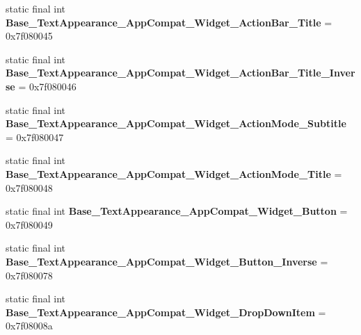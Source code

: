 \begin{DoxyCompactItemize}
\item 
\hypertarget{classandroid_1_1support_1_1v7_1_1appcompat_1_1_r_1_1style_a172e7de6432bf1869463c82f2299a826}{}static final int {\bfseries Base\+\_\+\+Text\+Appearance\+\_\+\+App\+Compat\+\_\+\+Widget\+\_\+\+Action\+Bar\+\_\+\+Title} = 0x7f080045\label{classandroid_1_1support_1_1v7_1_1appcompat_1_1_r_1_1style_a172e7de6432bf1869463c82f2299a826}

\item 
\hypertarget{classandroid_1_1support_1_1v7_1_1appcompat_1_1_r_1_1style_a69c4b6d6b5c8b2c1cf77fe514dd5c730}{}static final int {\bfseries Base\+\_\+\+Text\+Appearance\+\_\+\+App\+Compat\+\_\+\+Widget\+\_\+\+Action\+Bar\+\_\+\+Title\+\_\+\+Inverse} = 0x7f080046\label{classandroid_1_1support_1_1v7_1_1appcompat_1_1_r_1_1style_a69c4b6d6b5c8b2c1cf77fe514dd5c730}

\item 
\hypertarget{classandroid_1_1support_1_1v7_1_1appcompat_1_1_r_1_1style_a1dd69fd2c890662bdfa8c771a70447d3}{}static final int {\bfseries Base\+\_\+\+Text\+Appearance\+\_\+\+App\+Compat\+\_\+\+Widget\+\_\+\+Action\+Mode\+\_\+\+Subtitle} = 0x7f080047\label{classandroid_1_1support_1_1v7_1_1appcompat_1_1_r_1_1style_a1dd69fd2c890662bdfa8c771a70447d3}

\item 
\hypertarget{classandroid_1_1support_1_1v7_1_1appcompat_1_1_r_1_1style_a80946fe67e73e49cfbb18f10b23c24df}{}static final int {\bfseries Base\+\_\+\+Text\+Appearance\+\_\+\+App\+Compat\+\_\+\+Widget\+\_\+\+Action\+Mode\+\_\+\+Title} = 0x7f080048\label{classandroid_1_1support_1_1v7_1_1appcompat_1_1_r_1_1style_a80946fe67e73e49cfbb18f10b23c24df}

\item 
\hypertarget{classandroid_1_1support_1_1v7_1_1appcompat_1_1_r_1_1style_a6b427ebdf19f05932f60ad867fb296aa}{}static final int {\bfseries Base\+\_\+\+Text\+Appearance\+\_\+\+App\+Compat\+\_\+\+Widget\+\_\+\+Button} = 0x7f080049\label{classandroid_1_1support_1_1v7_1_1appcompat_1_1_r_1_1style_a6b427ebdf19f05932f60ad867fb296aa}

\item 
\hypertarget{classandroid_1_1support_1_1v7_1_1appcompat_1_1_r_1_1style_a75ec267d85c6e46c57ff7717ceafad6a}{}static final int {\bfseries Base\+\_\+\+Text\+Appearance\+\_\+\+App\+Compat\+\_\+\+Widget\+\_\+\+Button\+\_\+\+Inverse} = 0x7f080078\label{classandroid_1_1support_1_1v7_1_1appcompat_1_1_r_1_1style_a75ec267d85c6e46c57ff7717ceafad6a}

\item 
\hypertarget{classandroid_1_1support_1_1v7_1_1appcompat_1_1_r_1_1style_a4d7e47ebc08a4b842b8fabdf576f3e3d}{}static final int {\bfseries Base\+\_\+\+Text\+Appearance\+\_\+\+App\+Compat\+\_\+\+Widget\+\_\+\+Drop\+Down\+Item} = 0x7f08008a\label{classandroid_1_1support_1_1v7_1_1appcompat_1_1_r_1_1style_a4d7e47ebc08a4b842b8fabdf576f3e3d}


\end{DoxyCompactItemize}
